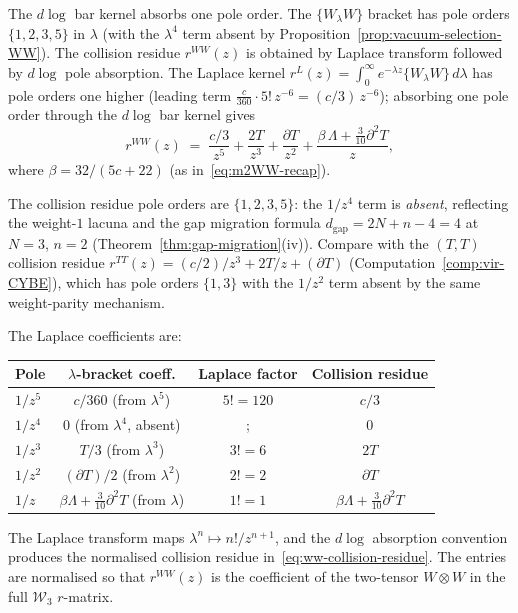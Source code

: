 \begin{computation}
\label{comp:ww-collision-residue}
%
%
The $d\log$ bar kernel absorbs one pole order.
The $\{W_\lambda W\}$ bracket has pole orders
$\{1, 2, 3, 5\}$ in $\lambda$ (with the $\lambda^4$
term absent by
Proposition~\ref{prop:vacuum-selection-WW}). The
collision residue $r^{WW}(z)$ is obtained by Laplace
transform followed by $d\log$ pole absorption. The Laplace
kernel $r^{L}(z) = \int_0^\infty e^{-\lambda z}\{W_\lambda W\}\,d\lambda$
has pole orders one higher (leading term $\tfrac{c}{360}\cdot 5!\,z^{-6} = (c/3)\,z^{-6}$);
absorbing one pole order through the $d\log$ bar kernel gives
\begin{equation}
\label{eq:ww-collision-residue}
r^{WW}(z)
\;=\;
\frac{c/3}{z^5}
+ \frac{2T}{z^3}
+ \frac{\partial T}{z^2}
+ \frac{\beta\,\Lambda + \tfrac{3}{10}\partial^2 T}{z},
\end{equation}
where $\beta = 32/(5c + 22)$ (as in~\eqref{eq:m2WW-recap}).

The collision residue pole orders are $\{1, 2, 3, 5\}$:
the $1/z^4$ term is \emph{absent}, reflecting the
weight-$1$ lacuna and the gap migration formula $d_{\mathrm{gap}} = 2N + n - 4 = 4$ at $N = 3$, $n = 2$ (Theorem~\ref{thm:gap-migration}(iv)). Compare with the $(T,T)$ collision
residue $r^{TT}(z) = (c/2)/z^3 + 2T/z + (\partial T)$
\textup{(}Computation~\textup{\ref{comp:vir-CYBE})},
which has pole orders $\{1, 3\}$ with the $1/z^2$ term
absent by the same weight-parity mechanism.

The Laplace coefficients are:
\begin{center}
\small
\renewcommand{\arraystretch}{1.3}
\begin{tabular}{lccc}
\toprule
\textbf{Pole} & \textbf{$\lambda$-bracket coeff.}
 & \textbf{Laplace factor}
 & \textbf{Collision residue} \\
\midrule
$1/z^5$ & $c/360$ (from $\lambda^5$)
 & $5! = 120$ & $c/3$ \\
$1/z^4$ & $0$ (from $\lambda^4$, absent)
 &; & $0$ \\
$1/z^3$ & $T/3$ (from $\lambda^3$)
 & $3! = 6$ & $2T$ \\
$1/z^2$ & $(\partial T)/2$ (from $\lambda^2$)
 & $2! = 2$ & $\partial T$ \\
$1/z$ & $\beta\Lambda + \tfrac{3}{10}\partial^2 T$ (from $\lambda$)
 & $1! = 1$ & $\beta\Lambda + \tfrac{3}{10}\partial^2 T$ \\
\bottomrule
\end{tabular}
\end{center}

\noindent
The Laplace transform maps $\lambda^n \mapsto n!/z^{n+1}$,
and the $d\log$ absorption convention produces the
normalised collision residue
in~\eqref{eq:ww-collision-residue}.
The entries are normalised so that $r^{WW}(z)$ is the
coefficient of the two-tensor $W \otimes W$ in the full
$\mathcal{W}_3$ $r$-matrix.
\end{computation}

